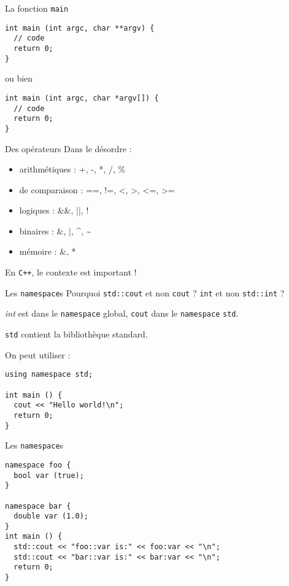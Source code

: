 \begin{frame}[fragile]{La fonction \texttt{main}}
  \begin{lstlisting}
int main (int argc, char **argv) {
  // code
  return 0;
}
  \end{lstlisting}
 ou bien
  \begin{lstlisting}
int main (int argc, char *argv[]) {
  // code
  return 0;
}
  \end{lstlisting}
\end{frame}

\begin{frame}{Des opérateurs}
  Dans le désordre :
  \begin{itemize}
  \item arithmétiques : +, -, *, /, \%
  \item de comparaison : ==, !=, <, >, <=, >=
  \item logiques : \&\&, ||, !
  \item binaires : \&, |, \^{}, \~{}
  \item mémoire : \&, *
  \end{itemize}

  En \texttt{C++}, le contexte est important !
\end{frame}

\begin{frame}[fragile]{Les \texttt{namespace}s}
  Pourquoi \texttt{std::cout} et non \texttt{cout} ? \texttt{int} et non \texttt{std::int} ?
  
  \textit{int} est dans le \texttt{namespace} global, \texttt{cout} dans le \texttt{namespace} \texttt{std}.
  
  \texttt{std} contient la bibliothèque standard.

  On peut utiliser :
  \begin{lstlisting}
using namespace std;

int main () {
  cout << "Hello world!\n";
  return 0;
}
  \end{lstlisting}
\end{frame}

\begin{frame}[fragile]{Les \texttt{namespace}s}
  \begin{lstlisting}
namespace foo {
  bool var (true);
}

namespace bar {
  double var (1.0);
}
int main () {
  std::cout << "foo::var is:" << foo:var << "\n";
  std::cout << "bar::var is:" << bar:var << "\n";
  return 0;
}
  \end{lstlisting}
\end{frame}
